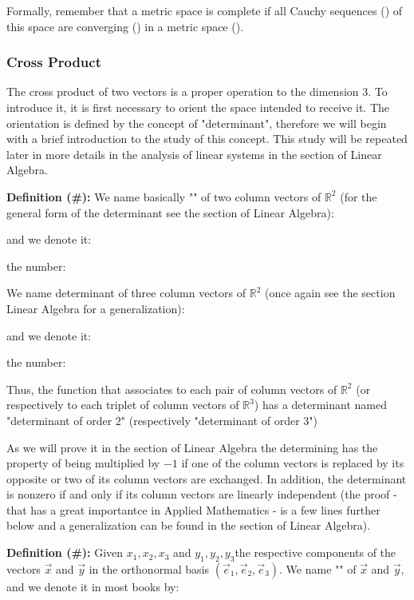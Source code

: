	Formally, remember that a metric space is complete if all Cauchy sequences () of this space are converging () in a metric space ().
	
	\subsubsection{Cross Product}
	The cross product of two vectors is a proper operation to the dimension $3$. To introduce it, it is first necessary to orient the space intended to receive it. The orientation is defined by the concept of "determinant", therefore we will begin with a brief introduction to the study of this concept. This study will be repeated later in more details in the analysis of linear systems in the section of Linear Algebra.
	
	\textbf{Definition (\#\mydef):} We name basically "" of two column vectors of $\mathbb{R}^2$ (for the general form of the determinant see the section of Linear Algebra):
	
	and we denote it:
	
	the number:
	
	We name determinant of three column vectors of $\mathbb{R}^2$ (once again see the section Linear Algebra for a generalization):
	
	and we denote it:
	
	the number:
	
	Thus, the function that associates to each pair of column vectors of $\mathbb{R}^2$ (or respectively to each triplet of column vectors of $\mathbb{R}^3$) has a determinant named "determinant of order $2$" (respectively "determinant of order $3$")
	
	As we will prove it in the section of Linear Algebra the determining has the property of being multiplied by $-1$ if one of the column vectors is replaced by its opposite or two of its column vectors are exchanged. In addition, the determinant is nonzero if and only if its column vectors are linearly independent (the proof - that has a great importantce in Applied Mathematics - is a few lines further below and a generalization  can be found in the section of Linear Algebra).
	
	\textbf{Definition (\#\mydef):} Given $x_1,x_2,x_3$ and $y_1,y_2,y_3$the respective components of the vectors $\vec{x}$ and  $\vec{y}$ in the orthonormal basis $(\vec{e}_1,\vec{e}_2,\vec{e}_3)$. We name "" of $\vec{x}$ and $\vec{y}$, and we denote it in most books by:
	

